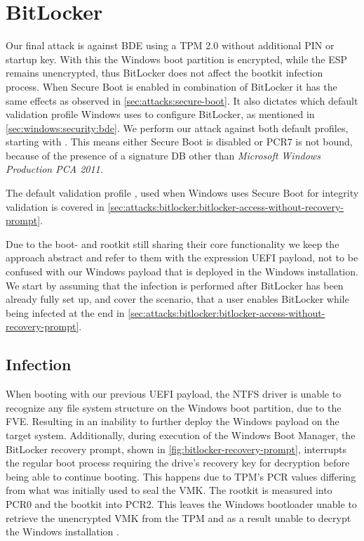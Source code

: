 \section{BitLocker}

Our final attack is against \ac{BDE} using a \ac{TPM} 2.0 without additional \ac{PIN} or startup key.
With this the Windows boot partition is encrypted, while the \ac{ESP} remains unencrypted, thus BitLocker does not affect the bootkit infection process.
When Secure Boot is enabled in combination of BitLocker it has the same effects as observed in \autoref{sec:attacks:secure-boot}.
It also dictates which default validation profile Windows uses to configure BitLocker, as mentioned in \autoref{sec:windows:security:bde}.
We perform our attack against both default profiles, starting with \hyperref[tab:pcr-usage]{}.
This means either Secure Boot is disabled or \ac{PCR}7 is not bound, because of the presence of a signature \ac{DB} other than \emph{Microsoft Windows Production PCA 2011}.

The default validation profile \hyperref[tab:pcr-usage]{}, used when Windows uses Secure Boot for integrity validation is covered in \autoref{sec:attacks:bitlocker:bitlocker-access-without-recovery-prompt}.

Due to the boot- and rootkit still sharing their core functionality we keep the approach abstract and refer to them with the expression \ac{UEFI} payload, not to be confused with our Windows payload that is deployed in the Windows installation.
We start by assuming that the infection is performed after BitLocker has been already fully set up, and cover the scenario, that a user enables BitLocker while being infected at the end in \autoref{sec:attacks:bitlocker:bitlocker-access-without-recovery-prompt}.


\subsection{Infection}

When booting with our previous \ac{UEFI} payload, the \ac{NTFS} driver is unable to recognize any file system structure  on the Windows boot partition, due to the \ac{FVE}.
Resulting in an inability to further deploy the Windows payload on the target system.
Additionally, during execution of the Windows Boot Manager, the BitLocker recovery prompt, shown in \autoref{fig:bitlocker-recovery-prompt}, interrupts the regular boot process requiring the drive's recovery key for decryption before being able to continue booting.
This happens due to \ac{TPM}'s \ac{PCR} values differing from what was initially used to seal the \ac{VMK}.
The rootkit is measured into \ac{PCR}0 and the bootkit into \ac{PCR}2.
This leaves the Windows bootloader unable to retrieve the unencrypted \ac{VMK} from the \ac{TPM} and as a result unable to decrypt the Windows installation \cite[Section 12]{windows-internals-7-part2}.

